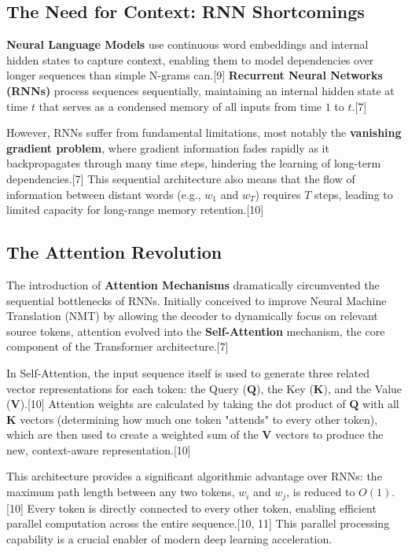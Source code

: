 \documentclass{article}
\begin{document}
\subsection{The Need for Context: RNN Shortcomings}

\textbf{Neural Language Models} use continuous word embeddings and internal hidden states to capture context, enabling them to model dependencies over longer sequences than simple N-grams can.[9] \textbf{Recurrent Neural Networks (RNNs)} process sequences sequentially, maintaining an internal hidden state at time $t$ that serves as a condensed memory of all inputs from time $1$ to $t$.[7]

However, RNNs suffer from fundamental limitations, most notably the \textbf{vanishing gradient problem}, where gradient information fades rapidly as it backpropagates through many time steps, hindering the learning of long-term dependencies.[7] This sequential architecture also means that the flow of information between distant words (e.g., $w_1$ and $w_T$) requires $T$ steps, leading to limited capacity for long-range memory retention.[10]

\subsection{The Attention Revolution}

The introduction of \textbf{Attention Mechanisms} dramatically circumvented the sequential bottlenecks of RNNs. Initially conceived to improve Neural Machine Translation (NMT) by allowing the decoder to dynamically focus on relevant source tokens, attention evolved into the \textbf{Self-Attention} mechanism, the core component of the Transformer architecture.[7]

In Self-Attention, the input sequence itself is used to generate three related vector representations for each token: the Query ($\mathbf{Q}$), the Key ($\mathbf{K}$), and the Value ($\mathbf{V}$).[10] Attention weights are calculated by taking the dot product of $\mathbf{Q}$ with all $\mathbf{K}$ vectors (determining how much one token "attends" to every other token), which are then used to create a weighted sum of the $\mathbf{V}$ vectors to produce the new, context-aware representation.[10]

This architecture provides a significant algorithmic advantage over RNNs: the maximum path length between any two tokens, $w_i$ and $w_j$, is reduced to $O(1)$.[10] Every token is directly connected to every other token, enabling efficient parallel computation across the entire sequence.[10, 11] This parallel processing capability is a crucial enabler of modern deep learning acceleration.
\end{document}
